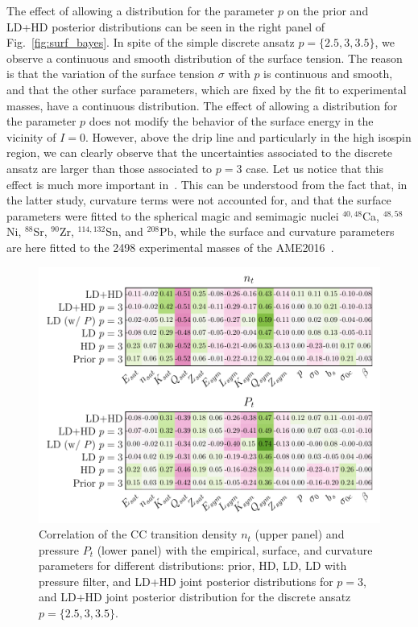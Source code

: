 The effect of allowing a distribution for the parameter $p$ on the 
prior and LD+HD posterior distributions can be seen in the right panel of 
Fig.~\ref{fig:surf_bayes}. In spite of the simple discrete ansatz
$p=\{2.5,3,3.5\}$, we observe a continuous and smooth distribution of the
surface tension. The reason is that the variation of the surface tension 
$\sigma$ with $p$ is continuous and smooth, and that the other surface
parameters, which are fixed by the fit to experimental masses, have a
continuous distribution. The effect of allowing a distribution for the
parameter $p$ does not modify the behavior of the surface energy in the
vicinity of $I=0$. However, above the drip line and particularly in the high
isospin region, we can clearly observe that the uncertainties associated to 
the discrete ansatz are larger than those associated to $p=3$ case. 
Let us notice that this effect is much more important in~\cite{Carreau2019cc}.
This can be understood from the fact that, in the latter study, curvature terms 
were not accounted for, and that the surface parameters were fitted
to the spherical magic and semimagic nuclei $^{40,48}$Ca, $^{48,58}$Ni,
$^{88}$Sr, $^{90}$Zr, $^{114,132}$Sn, and $^{208}$Pb, while the surface and 
curvature parameters are here fitted to the 2498 experimental masses of the 
AME2016~\cite{Huang2017}.

\begin{figure}[!t]
  \begin{center}
    \includegraphics[width=\linewidth]{figures/corr_ntpt_pars.pdf}
  \end{center}
  \caption[Correlation of the crust-core transition density and pressure with 
  the equation of state parameters for different filters]{Correlation of the CC 
    transition 
    density $n_t$ (upper panel) and pressure $P_t$ (lower panel) with the
    empirical, surface, and curvature parameters for different distributions: 
    prior, HD, LD, LD with pressure filter, and LD+HD joint posterior 
    distributions for $p=3$, and LD+HD joint posterior distribution for the 
    discrete ansatz $p=\{2.5,3,3.5\}$.}\label{fig:corr_ntpt_pars}
\end{figure}

